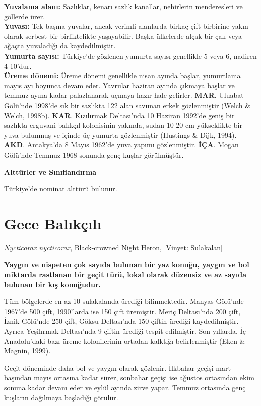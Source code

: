 \documentclass[
  a4paper,
  DIV=11,
  numbers=noendperiod]{scrreprt}
\begin{document}
\textbf{Yuvalama alanı:} Sazlıklar, kenarı sazlık kanallar, nehirlerin
menderesleri ve göllerde ürer.\\
\textbf{Yuvası:} Tek başına yuvalar, ancak verimli alanlarda birkaç çift
birbirine yakın olarak serbest bir birliktelikte yaşayabilir. Başka
ülkelerde alçak bir çalı veya ağaçta yuvaladığı da kaydedilmiştir.\\
\textbf{Yumurta sayısı:} Türkiye'de gözlenen yumurta sayısı genellikle 5
veya 6, nadiren 4-10'dur.\\
\textbf{Üreme dönemi:} Üreme dönemi genellikle nisan ayında başlar,
yumurtlama mayıs ayı boyunca devam eder. Yavrular haziran ayında çıkmaya
başlar ve temmuz ayına kadar palazlanarak uçmaya hazır hale gelirler.
\textbf{MAR}. Uluabat Gölü'nde 1998'de sık bir sazlıkta 122 alan savunan
erkek gözlenmiştir (Welch \& Welch, 1998b). \textbf{KAR}. Kızılırmak
Deltası'nda 10 Haziran 1992'de geniş bir sazlıkta erguvani balıkçıl
kolonisinin yakında, sudan 10-20 cm yükseklikte bir yuva bulunmuş ve
içinde üç yumurta gözlenmiştir (Hustings \& Dijk, 1994). \textbf{AKD}.
Antakya'da 8 Mayıs 1962'de yuva yapımı gözlenmiştir. \textbf{İÇA}. Mogan
Gölü'nde Temmuz 1968 sonunda genç kuşlar görülmüştür.

\textbf{Alttürler ve Sınıflandırma}

Türkiye'de nominat alttürü bulunur.

\section{Gece Balıkçılı}\label{gece-balux131kuxe7ux131lux131}

\emph{Nycticorax nycticorax}, Black-crowned Night Heron, {[}Vinyet:
Sulakalan{]}

\textbf{Yaygın ve nispeten çok sayıda bulunan bir yaz konuğu, yaygın ve
bol miktarda rastlanan bir geçit türü, lokal olarak düzensiz ve az
sayıda bulunan bir kış konuğudur.}

Tüm bölgelerde en az 10 sulakalanda ürediği bilinmektedir. Manyas
Gölü'nde 1967'de 500 çift, 1990'larda ise 150 çift üremiştir. Meriç
Deltası'nda 200 çift, İznik Gölü'nde 250 çift, Göksu Deltası'nda 150
çiftin ürediği kaydedilmiştir. Ayrıca Yeşilırmak Deltası'nda 9 çiftin
ürediği tespit edilmiştir. Son yıllarda, İç Anadolu'daki bazı üreme
kolonilerinin ortadan kalktığı belirlenmiştir (Eken \& Magnin, 1999).

Geçit döneminde daha bol ve yaygın olarak gözlenir. İlkbahar geçişi mart
başından mayıs ortasına kadar sürer, sonbahar geçişi ise ağustos
ortasından ekim sonuna kadar devam eder ve eylül ayında zirve yapar.
Temmuz ortasında genç kuşların dağılmaya başladığı görülür.
\end{document}
